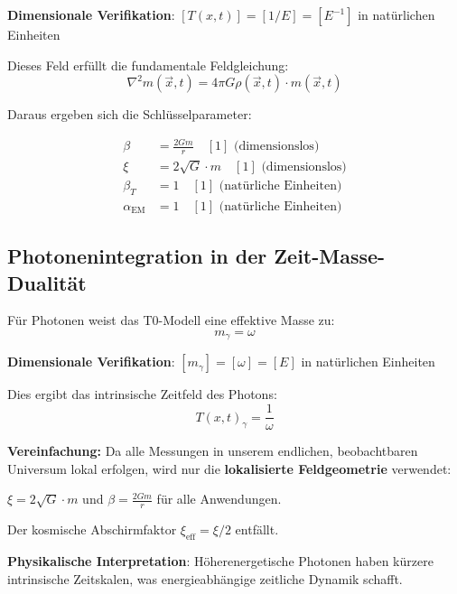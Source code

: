 \documentclass[12pt,a4paper]{article}
\newcommand{\Tfield}{T(x,t)}
\begin{document}
	\textbf{Dimensionale Verifikation}: $[\Tfield] = [1/E] = [E^{-1}]$ in natürlichen Einheiten \checkmark
	
	Dieses Feld erfüllt die fundamentale Feldgleichung:
	\begin{equation}
		\nabla^2 m(\vec{x},t) = 4\pi G \rho(\vec{x},t) \cdot m(\vec{x},t)
		\label{eq:field_equation}
	\end{equation}
	
	Daraus ergeben sich die Schlüsselparameter:
	
	\begin{tcolorbox}[colback=blue!5!white,colframe=blue!75!black,title=T0-Modell-Parameter für Photonenanalyse]
		\begin{align}
			\beta &= \frac{2Gm}{r} \quad [1] \text{ (dimensionslos)} \\
			\xi &= 2\sqrt{G} \cdot m \quad [1] \text{ (dimensionslos)} \\
			\beta_T &= 1 \quad [1] \text{ (natürliche Einheiten)} \\
			\alpha_{\text{EM}} &= 1 \quad [1] \text{ (natürliche Einheiten)}
		\end{align}
	\end{tcolorbox}
	
	\subsection{Photonenintegration in der Zeit-Masse-Dualität}
	
	Für Photonen weist das T0-Modell eine effektive Masse zu:
	\begin{equation}
		m_\gamma = \omega
		\label{eq:photon_effective_mass}
	\end{equation}
	
	\textbf{Dimensionale Verifikation}: $[m_\gamma] = [\omega] = [E]$ in natürlichen Einheiten \checkmark
	
	Dies ergibt das intrinsische Zeitfeld des Photons:
	\begin{equation}
		\Tfield_\gamma = \frac{1}{\omega}
		\label{eq:photon_time_field}
	\end{equation}
	
	\begin{tcolorbox}[colback=yellow!5!white,colframe=orange!75!black,title=Praktische Vereinfachung]
		\textbf{Vereinfachung:} Da alle Messungen in unserem endlichen, beobachtbaren Universum lokal erfolgen, wird nur die \textbf{lokalisierte Feldgeometrie} verwendet:
		
		$\xi = 2\sqrt{G} \cdot m$ und $\beta = \frac{2Gm}{r}$ für alle Anwendungen.
		
		Der kosmische Abschirmfaktor $\xi_{\text{eff}} = \xi/2$ entfällt.
	\end{tcolorbox}	
	\textbf{Physikalische Interpretation}: Höherenergetische Photonen haben kürzere intrinsische Zeitskalen, was energieabhängige zeitliche Dynamik schafft.
	
\end{document}
